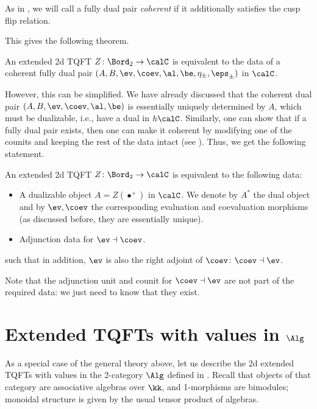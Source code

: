 As in \cite{pstragowski}, we will call a fully dual pair \emph{coherent}
if it additionally satisfies the cusp flip relation.

This gives the following theorem.

\begin{theorem}\label{t:2d-etqft-classification1}
  An extended 2d TQFT $Z\colon \Bord_2\to \calC$ is equivalent to the
  data of a coherent fully dual pair
  $(A, B, \ev, \coev, \al, \be, \eta_\pm, \eps_\pm)$ in $\calC$.
\end{theorem}

However, this can be simplified. We have already discussed that the
coherent dual pair $(A, B, \ev, \coev, \al, \be)$ is essentially
uniquely determined by $A$, which must be dualizable, i.e., have a
dual in $h\calC$. Similarly, one can show that if a fully dual pair exists,
then one can make it coherent by modifying one of the counits and keeping
the rest of the data intact (see \cite[Theorem 3.16]{pstragowski}). Thus, we
get the following statement.

\begin{theorem}\label{t:2d-etqft-classification2}
  An extended 2d TQFT $Z\colon \Bord_2\to \calC$ is equivalent to the
  following data:
  \begin{itemize}
    \item A dualizable object $A=Z(\bullet^+)$ in $\calC$. We denote by
    $A^*$ the dual object and by $\ev, \coev$ the corresponding evaluation
    and coevaluation morphisms
    \textup{(}as discussed before, they are essentially unique\textup{)}.
    \item Adjunction data for $\ev\dashv \coev$.
  \end{itemize}
  such that in addition, $\ev$ is also the right adjoint of $\coev$:
   $\coev \dashv \ev$.
\end{theorem}

Note that the adjunction unit and counit for $\coev \dashv \ev$ are not
part of the required data: we just need to know that they exist.


\section{Extended TQFTs with values in $\Alg$}\label{s:extended-alg}

As a special case of the general theory above, let us describe the 2d
extended TQFTs with values in the 2-category $\Alg$ defined in
. Recall that objects of that category are associative
algebras over $\kk$, and 1-morphisms are bimodules; monoidal structure is
given by the usual tensor product of algebras.

